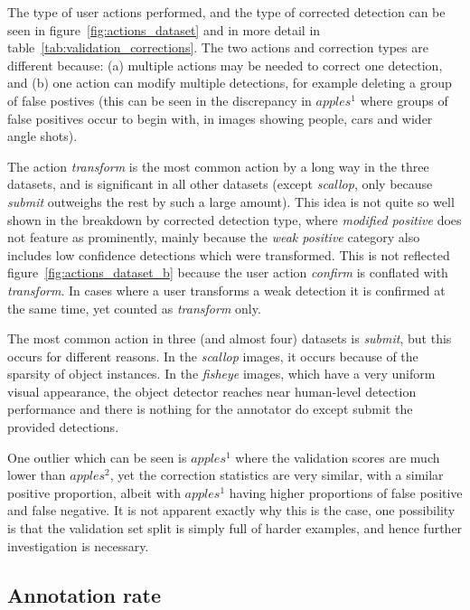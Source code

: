 The type of user actions performed, and the type of corrected detection can be seen in figure~\ref{fig:actions_dataset} and in more detail in table~\ref{tab:validation_corrections}. The two actions and correction types are different because: (a) multiple actions may be needed to correct one detection, and (b) one action can modify multiple detections, for example deleting a group of false postives (this can be seen in the discrepancy in $apples^1$ where groups of false positives occur to begin with, in images showing people, cars and wider angle shots). 

The action \emph{transform} is the most common action by a long way in the three datasets, and is significant in all other datasets (except \emph{scallop}, only because \emph{submit} outweighs the rest by such a large amount). This idea is not quite so well shown in the breakdown by corrected detection type, where \emph{modified positive} does not feature as prominently, mainly because the \emph{weak positive} category also includes low confidence detections which were transformed. This is not reflected figure~\ref{fig:actions_dataset_b} because the user action \emph{confirm} is conflated with \emph{transform}. In cases where a user transforms a weak detection it is confirmed at the same time, yet counted as \emph{transform} only.

The most common action in three (and almost four) datasets is \emph{submit}, but this occurs for different reasons. In the \emph{scallop} images, it occurs because of the sparsity of object instances. In the \emph{fisheye} images, which have a very uniform visual appearance, the object detector reaches near human-level detection performance and there is nothing for the annotator do except submit the provided detections.

One outlier which can be seen is $apples^1$ where the validation scores are much lower than $apples^2$, yet the correction statistics are very similar, with a similar positive proportion, albeit with $apples^1$ having higher proportions of false positive and false negative. It is not apparent exactly why this is the case, one possibility is that the validation set split is simply full of harder examples, and hence further investigation is necessary.

\subsection{Annotation rate}
\label{sec:annotation_rate}

